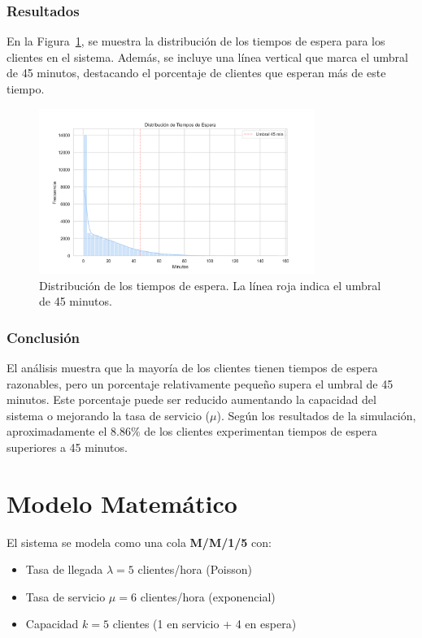 \documentclass{article}
\begin{document}
\subsubsection{Resultados}

En la Figura~\ref{fig:distribucion_esperas}, se muestra la distribución de los tiempos de espera 
para los clientes en el sistema. Además, se incluye una línea vertical que marca el umbral de 
45 minutos, destacando el porcentaje de clientes que esperan más de este tiempo.

\begin{figure}[H]
    \centering
    \includegraphics[width=0.8\textwidth]{../images/distribucion_esperas.png}
    \caption{Distribución de los tiempos de espera. La línea roja indica el umbral de 45 minutos.}
    \label{fig:distribucion_esperas}
\end{figure}

\subsubsection{Conclusión}

El análisis muestra que la mayoría de los clientes tienen tiempos de espera razonables, pero un 
porcentaje relativamente pequeño supera el umbral de 45 minutos. Este porcentaje puede ser reducido 
aumentando la capacidad del sistema o mejorando la tasa de servicio (\(\mu\)). Según los 
resultados de la simulación, aproximadamente el \(8.86\%\) de los clientes experimentan tiempos 
de espera superiores a 45 minutos.

\section{Modelo Matemático}
El sistema se modela como una cola \textbf{M/M/1/5} con:
\begin{itemize}
    \item Tasa de llegada $\lambda = 5$ clientes/hora (Poisson)
    \item Tasa de servicio $\mu = 6$ clientes/hora (exponencial)
    \item Capacidad $k = 5$ clientes (1 en servicio + 4 en espera)
\end{itemize}
\end{document}
